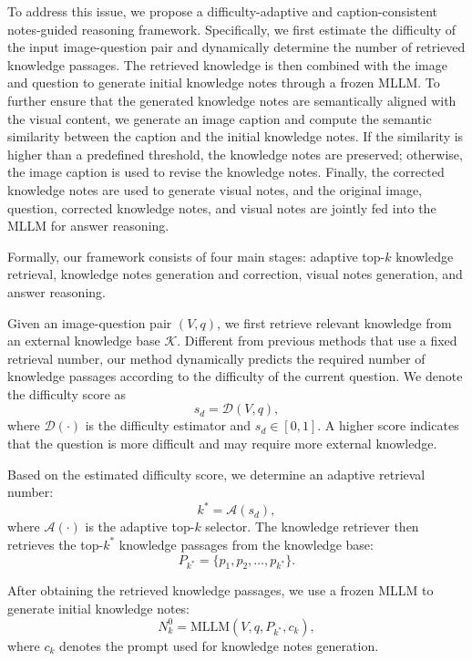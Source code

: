 \documentclass[manuscript,screen,review]{acmart}
\begin{document}
To address this issue, we propose a difficulty-adaptive and caption-consistent notes-guided reasoning framework. Specifically, we first estimate the difficulty of the input image-question pair and dynamically determine the number of retrieved knowledge passages. The retrieved knowledge is then combined with the image and question to generate initial knowledge notes through a frozen MLLM. To further ensure that the generated knowledge notes are semantically aligned with the visual content, we generate an image caption and compute the semantic similarity between the caption and the initial knowledge notes. If the similarity is higher than a predefined threshold, the knowledge notes are preserved; otherwise, the image caption is used to revise the knowledge notes. Finally, the corrected knowledge notes are used to generate visual notes, and the original image, question, corrected knowledge notes, and visual notes are jointly fed into the MLLM for answer reasoning.

Formally, our framework consists of four main stages: adaptive top-$k$ knowledge retrieval, knowledge notes generation and correction, visual notes generation, and answer reasoning.

Given an image-question pair $(V, q)$, we first retrieve relevant knowledge from an external knowledge base $\mathcal{K}$. Different from previous methods that use a fixed retrieval number, our method dynamically predicts the required number of knowledge passages according to the difficulty of the current question. We denote the difficulty score as
\begin{equation}
s_d = \mathcal{D}(V, q),
\end{equation}
where $\mathcal{D}(\cdot)$ is the difficulty estimator and $s_d \in [0,1]$. A higher score indicates that the question is more difficult and may require more external knowledge.

Based on the estimated difficulty score, we determine an adaptive retrieval number:
\begin{equation}
k^{*} = \mathcal{A}(s_d),
\end{equation}
where $\mathcal{A}(\cdot)$ is the adaptive top-$k$ selector. The knowledge retriever then retrieves the top-$k^{*}$ knowledge passages from the knowledge base:
\begin{equation}
P_{k^{*}} = \{p_1, p_2, \ldots, p_{k^{*}}\}.
\end{equation}

After obtaining the retrieved knowledge passages, we use a frozen MLLM to generate initial knowledge notes:
\begin{equation}
N_k^{0} = \text{MLLM}(V, q, P_{k^{*}}, c_k),
\end{equation}
where $c_k$ denotes the prompt used for knowledge notes generation.
\end{document}
